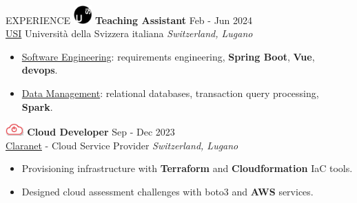 \documentclass{cv} %
\def\intraexpvspace{0.15cm}
\begin{document}
\begin{minipage}[b][0.9\paperheight][t]{0.7\linewidth}
\begin{rSection}{EXPERIENCE}
    \includegraphics[width=0.7cm, trim={0cm 10cm 0cm 0cm}]{usi-icon.png}
    \hspace*{0cm}\textbf{Teaching Assistant} \hfill Feb - Jun 2024\\
    \hspace*{0.85cm}\href{https://www.usi.ch/}{USI} Università della Svizzera italiana
    \hfill \textit{Switzerland, Lugano}
    \begin{itemize}
        \item \href{https://search.usi.ch/it/corsi/35268192/software-atelier-4-software-engineering-project}{Software Engineering}: 
        requirements engineering, \textbf{Spring Boot}, \textbf{Vue}, \textbf{devops}.

        \item \href{https://search.usi.ch/it/corsi/35268184/data-management}{Data Management}: 
        relational databases, transaction query processing, \textbf{Spark}.
    \end{itemize}
    \vspace{\intraexpvspace}
    \vspace{\intraexpvspace}

    \includegraphics[width=0.7cm, trim={0cm 15cm 0cm 0cm}]{claranet-logo.png}
    \textbf{Cloud Developer} \hfill Sep - Dec 2023\\
    \hspace*{0.85cm}\href{https://www.claranet.com/}{Claranet} - Cloud Service Provider
    \hfill \textit{Switzerland, Lugano}
    \begin{itemize}
        \item Provisioning infrastructure with \textbf{Terraform} and \textbf{Cloudformation}
            IaC tools.

        \item Designed cloud assessment challenges with boto3 and \textbf{AWS} services.
    \end{itemize}
    \vspace{\intraexpvspace}
    \vspace{\intraexpvspace}


\end{rSection}
\end{minipage}
\end{document}
